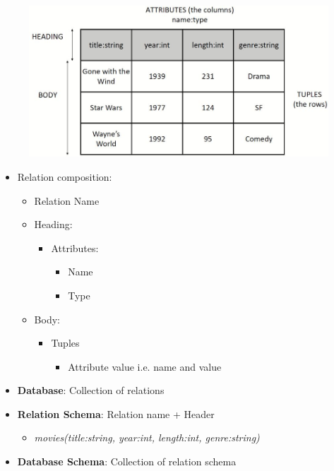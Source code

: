 \documentclass[conference]{IEEEtran}
\begin{document}
\begin{figure} [h!]
    \centering
    \includegraphics[scale=0.45]{Ex14.JPG}
\end{figure}

\begin{itemize}
    \item Relation composition:
    \begin{itemize}
        \item Relation Name
        
        \item Heading:
        \begin{itemize}
            \item Attributes:
            \begin{itemize}
                \item Name 
                \item Type
            \end{itemize}
        \end{itemize}
    
        \item Body:
        \begin{itemize}
            \item Tuples 
            \begin{itemize}
                \item Attribute value i.e. name and value
            \end{itemize}
        \end{itemize}
    \end{itemize}

    \item \textbf{Database}: Collection of relations
    \item \textbf{Relation Schema}: Relation name + Header
    \begin{itemize}
        \item \textit{movies(title:string, year:int, length:int, genre:string)}
    \end{itemize}
    \item \textbf{Database Schema}: Collection of relation schema
\end{itemize}
\end{document}
